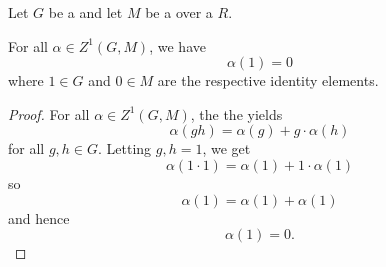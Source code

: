 \begin{lemma} \label{lemma:value_of_1_cocycle_of_a_group_module_at_the_identity_element_is_zero}
    Let $G$ be a  and let $M$ be a  over a  $R$.

    For all $\alpha \in Z^1(G,M)$, we have 
    $$\alpha(1) = 0$$
    where $1 \in G$ and $0 \in M$ are the respective identity elements.
\end{lemma}
\begin{proof}
    For all $\alpha \in Z^1(G,M)$, the the  yields
    $$\alpha(gh) = \alpha(g) + g \cdot \alpha(h)$$
    for all $g,h \in G$.
    Letting $g,h = 1$, we get 
    $$\alpha(1 \cdot 1) = \alpha(1) + 1 \cdot \alpha(1)$$
    so 
    $$\alpha(1) = \alpha(1) + \alpha(1)$$
    and hence
    $$\alpha(1) = 0.$$
\end{proof}